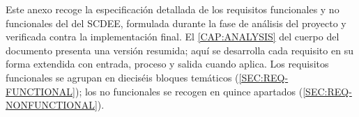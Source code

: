 Este anexo recoge la especificación detallada de los requisitos
funcionales y no funcionales del  del SCDEE, formulada
durante la fase de análisis del proyecto y verificada contra la
implementación final. El \cref{CAP:ANALYSIS} del cuerpo del documento
presenta una versión resumida; aquí se desarrolla cada requisito en su
forma extendida con entrada, proceso y salida cuando aplica. Los
requisitos funcionales se agrupan en dieciséis bloques temáticos
(\cref{SEC:REQ-FUNCTIONAL}); los no funcionales se recogen en quince
apartados (\cref{SEC:REQ-NONFUNCTIONAL}).
